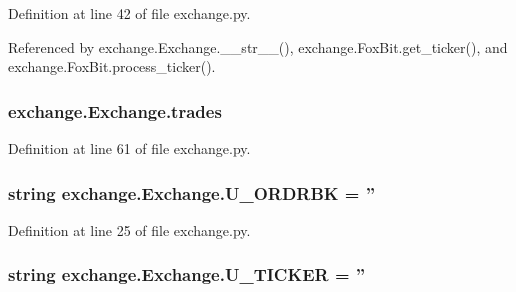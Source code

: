 Definition at line 42 of file exchange.\-py.



Referenced by exchange.\-Exchange.\-\_\-\-\_\-str\-\_\-\-\_\-(), exchange.\-Fox\-Bit.\-get\-\_\-ticker(), and exchange.\-Fox\-Bit.\-process\-\_\-ticker().

\hypertarget{classexchange_1_1_exchange_a30e87a377320ce05bd956fb014683641}{
\subsubsection[{trades}]{\setlength{\rightskip}{0pt plus 5cm}exchange.\-Exchange.\-trades}}\label{classexchange_1_1_exchange_a30e87a377320ce05bd956fb014683641}


Definition at line 61 of file exchange.\-py.

\hypertarget{classexchange_1_1_exchange_a83174d2fe96a1c737231d3b8b18d9807}{
\subsubsection[{U\-\_\-\-O\-R\-D\-R\-B\-K}]{\setlength{\rightskip}{0pt plus 5cm}string exchange.\-Exchange.\-U\-\_\-\-O\-R\-D\-R\-B\-K = ''\hspace{0.3cm}{\ttfamily [static]}}}\label{classexchange_1_1_exchange_a83174d2fe96a1c737231d3b8b18d9807}


Definition at line 25 of file exchange.\-py.

\hypertarget{classexchange_1_1_exchange_ab16df02480d727c533b02b5b7afa053b}{
\subsubsection[{U\-\_\-\-T\-I\-C\-K\-E\-R}]{\setlength{\rightskip}{0pt plus 5cm}string exchange.\-Exchange.\-U\-\_\-\-T\-I\-C\-K\-E\-R = ''\hspace{0.3cm}{\ttfamily [static]}}}\label{classexchange_1_1_exchange_ab16df02480d727c533b02b5b7afa053b}


